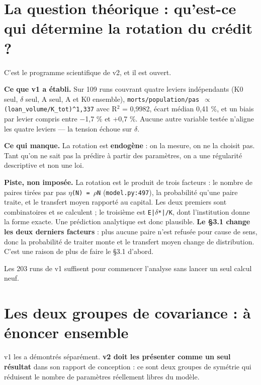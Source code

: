 \documentclass[11pt,a4paper]{article}
\newcommand{\code}[1]{\texttt{#1}}
\begin{document}
\bigskip

\setcounter{section}{4}
\section{La question théorique : qu'est-ce qui détermine la rotation du crédit ?}

C'est le programme scientifique de v2, et il est ouvert.

\textbf{Ce que v1 a établi.} Sur 109 runs couvrant quatre leviers indépendants (K0 seul, \ensuremath{\delta} seul, A seul, A et K0 ensemble), \code{morts/population/pas \ensuremath{\propto} (loan\_volume/K\_tot)\textasciicircum{}1,337} avec R\ensuremath{^2} = 0,9982, écart médian 0,41 \%, et un biais par levier compris entre \ensuremath{-}1,7 \% et +0,7 \%. Aucune autre variable testée n'aligne les quatre leviers --- la tension échoue sur \ensuremath{\delta}.

\textbf{Ce qui manque.} La rotation est \textbf{endogène} : on la mesure, on ne la choisit pas. Tant qu'on ne sait pas la prédire à partir des paramètres, on a une régularité descriptive et non une loi.

\textbf{Piste, non imposée.} La rotation est le produit de trois facteurs : le nombre de paires tirées par pas \code{\ensuremath{\eta}(N) = \ensuremath{\rho}N} (\code{model.py:497}), la probabilité qu'une paire traite, et le transfert moyen rapporté au capital. Les deux premiers sont combinatoires et se calculent ; le troisième est \code{E|\ensuremath{\delta}*|/K}, dont l'institution donne la forme exacte. Une prédiction analytique est donc plausible. \textbf{Le §3.1 change les deux derniers facteurs} : plus aucune paire n'est refusée pour cause de sens, donc la probabilité de traiter monte et le transfert moyen change de distribution. C'est une raison de plus de faire le §3.1 d'abord.

Les 203 runs de v1 suffisent pour commencer l'analyse sans lancer un seul calcul neuf.

\bigskip

\setcounter{section}{5}
\section{Les deux groupes de covariance : à énoncer ensemble}

v1 les a démontrés séparément. \textbf{v2 doit les présenter comme un seul résultat} dans son rapport de conception : ce sont deux groupes de symétrie qui réduisent le nombre de paramètres réellement libres du modèle.
\end{document}

